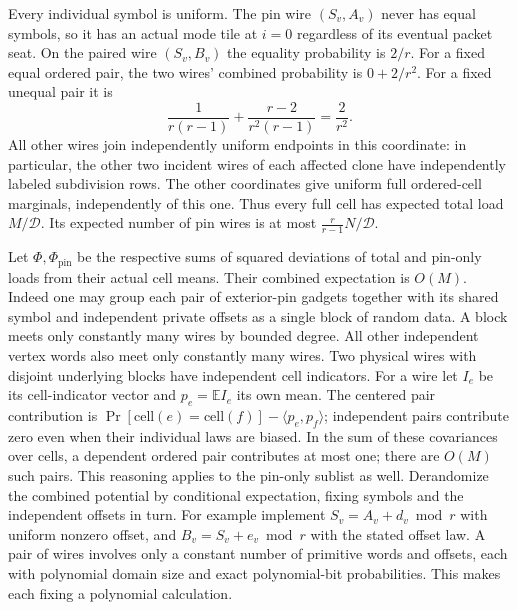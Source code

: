 \documentclass[
  11pt,
]{article}
\begin{document}
Every individual symbol is uniform. The pin wire \((S_v,A_v)\) never has
equal symbols, so it has an actual mode tile at \(i=0\) regardless of
its eventual packet seat. On the paired wire \((S_v,B_v)\) the equality
probability is \(2/r\). For a fixed equal ordered pair, the two wires'
combined probability is \(0+2/r^2\). For a fixed unequal pair it is \[
          \frac1{r(r-1)}+\frac{r-2}{r^2(r-1)}=\frac2{r^2}.
\] All other wires join independently uniform endpoints in this
coordinate: in particular, the other two incident wires of each affected
clone have independently labeled subdivision rows. The other coordinates
give uniform full ordered-cell marginals, independently of this one.
Thus every full cell has expected total load \(M/\mathcal D\). Its
expected number of pin wires is at most \(\frac{r}{r-1}N/\mathcal D\).

Let \(\Phi,\Phi_{\mathrm{pin}}\) be the respective sums of squared
deviations of total and pin-only loads from their actual cell means.
Their combined expectation is \(O(M)\). Indeed one may group each pair
of exterior-pin gadgets together with its shared symbol and independent
private offsets as a single block of random data. A block meets only
constantly many wires by bounded degree. All other independent vertex
words also meet only constantly many wires. Two physical wires with
disjoint underlying blocks have independent cell indicators. For a wire
let \(I_e\) be its cell-indicator vector and \(p_e=\mathbb E I_e\) its
own mean. The centered pair contribution is
\(\Pr[\mathrm{cell}(e)=\mathrm{cell}(f)]-\langle p_e,p_f\rangle\);
independent pairs contribute zero even when their individual laws are
biased. In the sum of these covariances over cells, a dependent ordered
pair contributes at most one; there are \(O(M)\) such pairs. This
reasoning applies to the pin-only sublist as well. Derandomize the
combined potential by conditional expectation, fixing symbols and the
independent offsets in turn. For example implement
\(S_v=A_v+d_v\bmod r\) with uniform nonzero offset, and
\(B_v=S_v+e_v\bmod r\) with the stated offset law. A pair of wires
involves only a constant number of primitive words and offsets, each
with polynomial domain size and exact polynomial-bit probabilities. This
makes each fixing a polynomial calculation.
\end{document}
